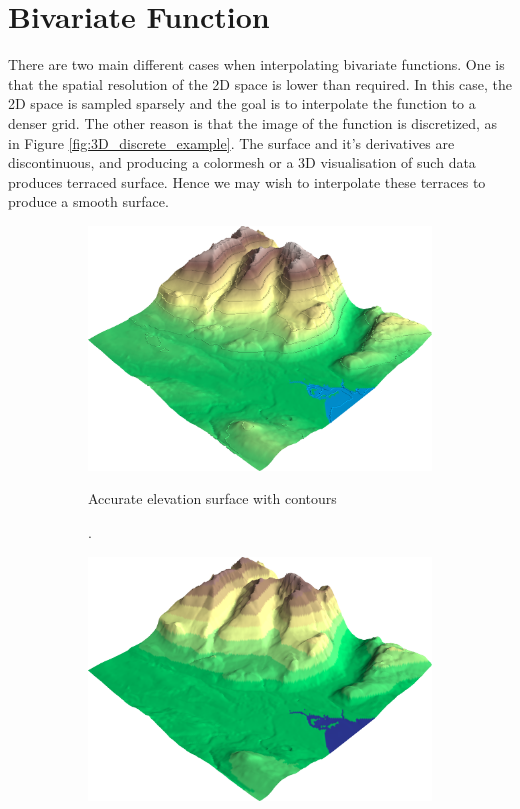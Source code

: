\documentclass[a4paper,10pt]{report}
\begin{document}
\section{Bivariate Function}
There are two main different cases when interpolating bivariate functions. One is that the spatial resolution of the 2D space is lower than required. In this case, the 2D space is sampled sparsely and the goal is to interpolate the function to a denser grid. The other reason is that the image of the function is discretized, as in Figure \ref{fig:3D_discrete_example}. The surface and it's derivatives are discontinuous, and producing a colormesh or a 3D visualisation of such data produces terraced surface. Hence we may wish to interpolate these terraces to produce a smooth surface.

\begin{figure}[H]
    \centering
    \begin{subfigure}{.3\textwidth}
        \includegraphics[width=1\textwidth]{../images/discretize/Accurate.png}
    \caption.{Accurate elevation surface with contours}
    \end{subfigure}
    \hfill
    \begin{subfigure}{.3\textwidth}
        \includegraphics[width=1\textwidth]{../images/discretize/Color_Graded.png}

\end{subfigure}
\end{figure}
\end{document}
